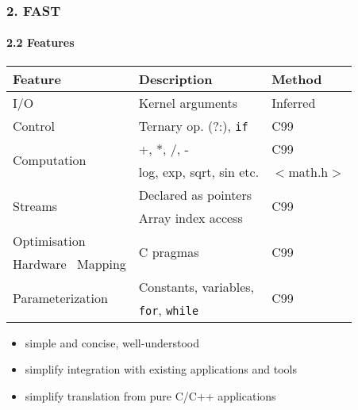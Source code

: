 \begin{frame}
  \frametitle{2. FAST}
  \framesubtitle{2.2 Features}

  {\footnotesize
    \begin{table}[!h]
      \centering
      \renewcommand{\arraystretch}{1.1}
      \begin{tabular}{p{}|p{}|p{}}
        \hline
        \bf{Feature}                        & \bf{Description}              & \bf{Method}          \\
        \hline\hline
        I/O                               & Kernel arguments              & Inferred             \\
        \hline
        Control                           & Ternary op. (?:), \texttt{if} & C99                  \\
        \hline
        \multirow{2}{*}{Computation}        & +, *, /, -                    & C99                  \\
        & log, exp, sqrt, sin etc.      & $<$math.h$>$         \\
        \hline
        \multirow{2}{*}{Streams}          & Declared as pointers          & \multirow{2}{*}{C99} \\
        & Array index access     &                      \\
        \hline
        Optimisation                      & \multirow{2}{*}{C pragmas}    & \multirow{2}{*}{C99} \\
        Hardware \  Mapping               &                               &                      \\
        \hline
        \multirow{2}{*}{Parameterization} & Constants, variables,         & \multirow{2}{*}{C99} \\
        & \texttt{for}, \texttt{while}  &                      \\
      \end{tabular}
    \end{table}
  }
  \begin{itemize}
  \item simple and concise, well-understood
  \item simplify integration with existing applications and tools
  \item simplify translation from pure C/C++ applications
  \end{itemize}
\end{frame}

